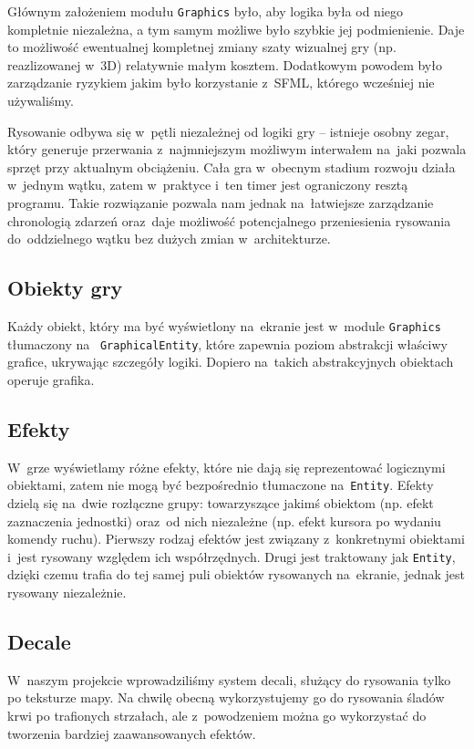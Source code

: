 \documentclass[licencjacka]{pracamgr}
\begin{document}
    Głównym założeniem modułu \texttt{Graphics} było, aby logika była od niego kompletnie niezależna, a tym samym możliwe
    było szybkie jej podmienienie. Daje to możliwość ewentualnej kompletnej zmiany szaty wizualnej gry (np. reazlizowanej
    w~3D) relatywnie małym kosztem. Dodatkowym powodem było zarządzanie ryzykiem jakim było korzystanie z~SFML, którego
    wcześniej nie używaliśmy.

    Rysowanie odbywa się w~pętli niezależnej od logiki gry -- istnieje osobny zegar, który generuje
    przerwania z~najmniejszym możliwym interwałem na~jaki pozwala sprzęt przy aktualnym obciążeniu. Cała gra w~obecnym
    stadium rozwoju działa w~jednym wątku, zatem w~praktyce i~ten timer jest ograniczony resztą programu. Takie
    rozwiązanie pozwala nam jednak na~łatwiejsze zarządzanie chronologią zdarzeń oraz~daje możliwość potencjalnego
    przeniesienia rysowania do~oddzielnego wątku bez dużych zmian w~architekturze.

    \subsection{Obiekty gry}
      Każdy obiekt, który ma być wyświetlony na~ekranie jest w~module \texttt{Graphics} tłumaczony na~
      \texttt{GraphicalEntity}, które zapewnia poziom abstrakcji właściwy grafice, ukrywając szczegóły logiki. Dopiero
      na~takich abstrakcyjnych obiektach operuje grafika.

    \subsection{Efekty}
      W~grze wyświetlamy różne efekty, które nie dają się reprezentować logicznymi obiektami, zatem nie mogą być
      bezpośrednio tłumaczone na~\texttt{Entity}. Efekty dzielą się na~dwie rozłączne grupy: towarzyszące jakimś obiektom
      (np. efekt zaznaczenia jednostki) oraz~od nich niezależne (np. efekt kursora po wydaniu komendy ruchu). Pierwszy
      rodzaj efektów jest związany z~konkretnymi obiektami i~jest rysowany względem ich współrzędnych. Drugi jest
      traktowany jak \texttt{Entity}, dzięki czemu trafia do tej samej puli obiektów rysowanych na~ekranie, jednak jest
      rysowany niezależnie.

    \subsection{Decale}
      W~naszym projekcie wprowadziliśmy system decali, służący do rysowania tylko po teksturze mapy. Na chwilę obecną
      wykorzystujemy go do rysowania śladów krwi po trafionych strzałach, ale z~powodzeniem można go wykorzystać do
      tworzenia bardziej zaawansowanych efektów.
\end{document}
